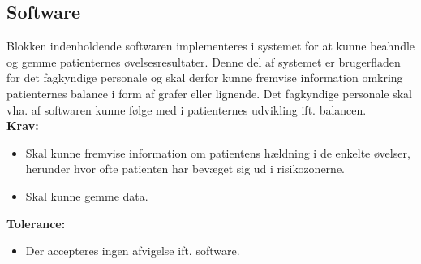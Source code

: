 \subsection{Software}
Blokken indenholdende softwaren implementeres i systemet for at kunne beahndle og gemme patienternes øvelsesresultater. Denne del af systemet er brugerfladen for det fagkyndige personale og skal derfor kunne fremvise information omkring patienternes balance i form af grafer eller lignende. Det fagkyndige personale skal vha. af softwaren kunne følge med i patienternes udvikling ift. balancen. \\
\textbf{Krav:}
\begin{itemize}
	\item Skal kunne fremvise information om patientens hældning i de enkelte øvelser, herunder hvor ofte patienten har bevæget sig ud i risikozonerne. 
	\item Skal kunne gemme data.
\end{itemize}
\textbf{Tolerance:}
\begin{itemize}
	\item Der accepteres ingen afvigelse ift. software. 
\end{itemize}